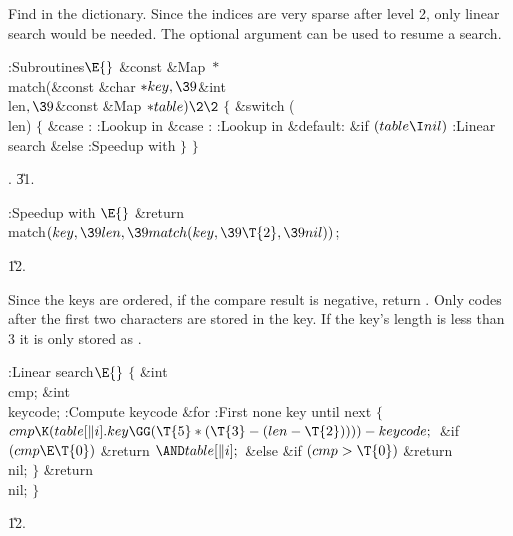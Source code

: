 Find in the dictionary. Since the indices are very sparse after
level 2, only linear search would be needed. The optional argument
 can be used to resume a search.

\Y\B\4:Subroutines\X${}\E{}$\6
\1\1\&{const} \&{Map} ${}{*}{}$\\{match}(\&{const} \&{char} ${}{*}\\{key},%
\39{}$\&{int} \\{len}${},\39{}$\&{const} \&{Map} ${}{*}\\{table})\2\2{}$\6
${}\{{}$\1\6
\&{switch} (\\{len})\5
${}\{{}$\1\6
\4\&{case} :\5
:Lookup in \X\6
\4\&{case} :\5
:Lookup in \X\6
\4\&{default}:\6
\&{if} ${}(\\{table}\I\\{nil}){}$\1\5
:Linear search\X\2\6
\&{else}\1\5
:Speedup with \X\2\6
\4${}\}{}$\2\6
\4${}\}{}$\2\par
{}.
\U31.\fi

\B{}:Speedup with \X${}\E{}$\6
\&{return} \\{match}${}(\\{key},\39\\{len},\39\\{match}(\\{key},\39\T{2},\39%
\\{nil})){}$;\par
\U12.\fi

Since the keys are ordered, if the compare result is negative,
return . Only codes after the first two characters are stored in
the key. If the key's length is less than 3 it is only stored as .

\Y\B\4:Linear search\X${}\E{}$\6
${}\{{}$\1\6
\&{int} \\{cmp};\6
\&{int} \\{keycode};\7
:Compute keycode\X\6
\&{for} :First none  key until next \X\5
${}\{{}$\1\6
${}\\{cmp}\K(\\{table}[\|i].\\{key}\GG(\T{5}*(\T{3}-(\\{len}-\T{2}))))-%
\\{keycode};{}$\6
\&{if} ${}(\\{cmp}\E\T{0}){}$\1\5
\&{return} ${}{\AND}\\{table}[\|i];{}$\2\6
\&{else} \&{if} ${}(\\{cmp}>\T{0}){}$\1\5
\&{return} \\{nil};\2\6
\4${}\}{}$\2\6
\&{return} \\{nil};\6
\4${}\}{}$\2\par
\U12.\fi

